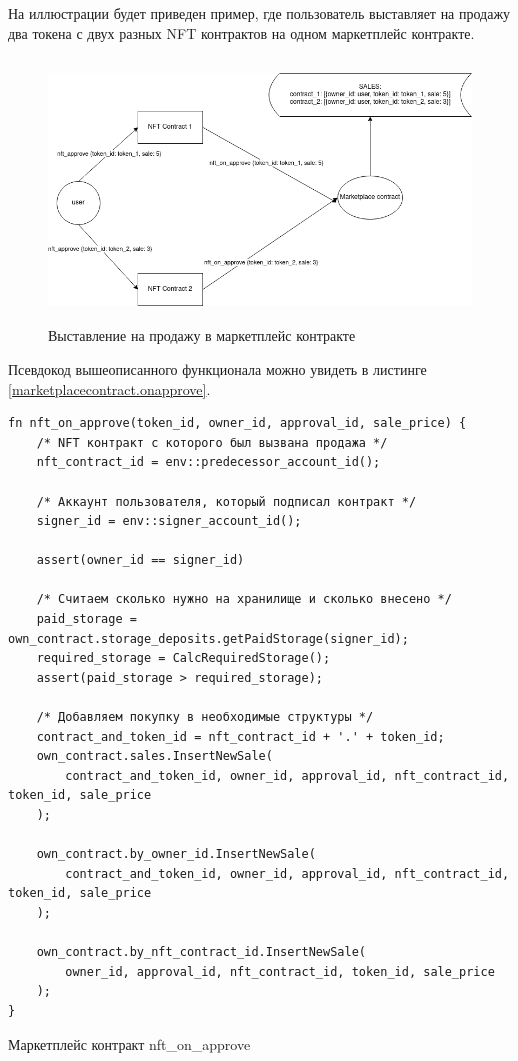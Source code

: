 На иллюстрации будет приведен пример, где пользователь выставляет на продажу два токена с двух разных NFT контрактов на одном маркетплейс контракте.

\begin{figure}[H]
	\centering
	\includegraphics[height=70mm]{fig/sell.png}
	\caption{Выставление на продажу в маркетплейс контракте}
\end{figure}

Псевдокод вышеописанного функционала можно увидеть в листинге {\color{blue}\ref{marketplacecontract.onapprove}}.

\begin{listing}
\begin{verbatim}
fn nft_on_approve(token_id, owner_id, approval_id, sale_price) {
    /* NFT контракт с которого был вызвана продажа */
    nft_contract_id = env::predecessor_account_id();

    /* Аккаунт пользователя, который подписал контракт */
    signer_id = env::signer_account_id();

    assert(owner_id == signer_id)

    /* Считаем сколько нужно на хранилище и сколько внесено */
    paid_storage = own_contract.storage_deposits.getPaidStorage(signer_id);
    required_storage = CalcRequiredStorage();
    assert(paid_storage > required_storage);

    /* Добавляем покупку в необходимые структуры */
    contract_and_token_id = nft_contract_id + '.' + token_id;
    own_contract.sales.InsertNewSale(
        contract_and_token_id, owner_id, approval_id, nft_contract_id, token_id, sale_price
    );

    own_contract.by_owner_id.InsertNewSale(
        contract_and_token_id, owner_id, approval_id, nft_contract_id, token_id, sale_price
    );

    own_contract.by_nft_contract_id.InsertNewSale(
        owner_id, approval_id, nft_contract_id, token_id, sale_price
    );
}
\end{verbatim}
\caption{Маркетплейс контракт nft\_on\_approve}
\label{marketplacecontract.onapprove}
\end{listing}

